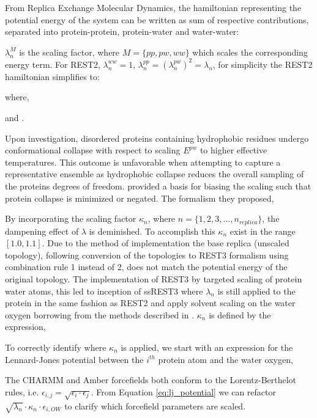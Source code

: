From Replica Exchange Molecular Dynamics\cite{Sugita1999}, the hamiltonian representing the potential energy of the system can be written as sum of respective contributions, separated into protein-protein, protein-water and water-water:

$\lambda_{n}^M$ is the scaling factor, where $M=\{ pp, pw, ww\}
$ which scales the corresponding energy term. For REST2\cite{Wang2011}, $\lambda_n^{ww}=1$, $\lambda_n^{pp}=(\lambda_n^{pw})^2=\lambda_n$, for simplicity the REST2 hamiltonian simplifies to:

where,

and . 

Upon investigation, disordered proteins containing hydrophobic residues undergo conformational collapse with respect to scaling  $E^{pw}$ to higher effective temperatures. 
This outcome is unfavorable when attempting to capture a representative ensemble as hydrophobic collapse reduces the overall sampling of the proteins degrees of freedom. %
\citeauthor{Zhang2023} \citeyear{Zhang2023} provided a basis for biasing the scaling such that protein collapse is minimized or negated. The formalism they proposed,

By incorporating the scaling factor $\kappa_n$, where $n=\{1,2,3,\ldots,n_{replica}\}$, the dampening effect of $\lambda$ is deminished. To accomplish this $\kappa_n$ exist in the range $[1.0,1.1]$. 
Due to the method of implementation the base replica (unscaled topology), following conversion of the topologies to REST3 \cite{Zhang2023} formalism using combination rule 1 instead of 2, does not match the potential energy of the original topology. 
The implementation of REST3 by \citeauthor{Zhang2023} targeted scaling of protein water atoms, this led to inception of ssREST3 where $\lambda_n$ is still applied to the protein in the same fashion as REST2 \cite{Wang2011} and apply solvent scaling on the water oxygen borrowing from the methods described in \citeauthor{Best2010} \citeyear{Best2010}. 
$\kappa_n$ is defined by the expression, 

To correctly identify where $\kappa_n$ is applied, we start with an expression for the Lennard-Jones potential between the $i^{th}$ protein atom and the water oxygen,

The CHARMM and Amber forcefields both conform to the Lorentz-Berthelot rules, i.e. $\epsilon_{i,j}=\sqrt{\epsilon_i\cdot \epsilon_j}$. 
From Equation \ref{eq:lj_potential} we can refactor $\sqrt{\lambda_n}\cdot\kappa_n\cdot\epsilon_{i,OW}$ to clarify which forcefield parameters are scaled. 


%



